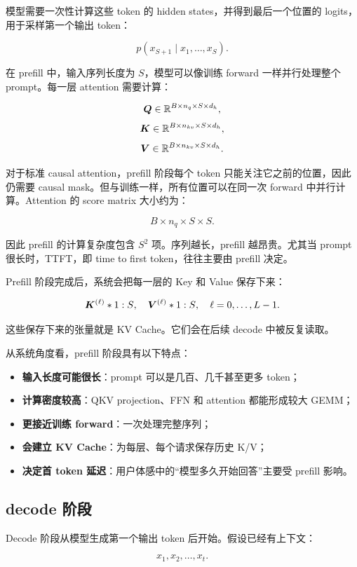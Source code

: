 模型需要一次性计算这些 token 的 hidden states，并得到最后一个位置的 logits，用于采样第一个输出 token：

\[
p(x_{S+1}\mid x_1,\ldots,x_S).
\]

在 prefill 中，输入序列长度为 $S$，模型可以像训练 forward 一样并行处理整个 prompt。每一层 attention 需要计算：

\[
\bm{Q}\in\mathbb{R}^{B\times n_q\times S\times d_h},
\]
\[
\bm{K}\in\mathbb{R}^{B\times n_{kv}\times S\times d_h},
\]
\[
\bm{V}\in\mathbb{R}^{B\times n_{kv}\times S\times d_h}.
\]

对于标准 causal attention，prefill 阶段每个 token 只能关注它之前的位置，因此仍需要 causal mask。但与训练一样，所有位置可以在同一次 forward 中并行计算。Attention 的 score matrix 大小约为：

\[
B\times n_q\times S\times S.
\]

因此 prefill 的计算复杂度包含 $S^2$ 项。序列越长，prefill 越昂贵。尤其当 prompt 很长时，TTFT，即 time to first token，往往主要由 prefill 决定。

Prefill 阶段完成后，系统会把每一层的 Key 和 Value 保存下来：

\[
\bm{K}^{(\ell)}*{1:S},
\quad
\bm{V}^{(\ell)}*{1:S},
\quad
\ell=0,\ldots,L-1.
\]

这些保存下来的张量就是 KV Cache。它们会在后续 decode 中被反复读取。

从系统角度看，prefill 阶段具有以下特点：

\begin{itemize}
\item \textbf{输入长度可能很长}：prompt 可以是几百、几千甚至更多 token；
\item \textbf{计算密度较高}：QKV projection、FFN 和 attention 都能形成较大 GEMM；
\item \textbf{更接近训练 forward}：一次处理完整序列；
\item \textbf{会建立 KV Cache}：为每层、每个请求保存历史 K/V；
\item \textbf{决定首 token 延迟}：用户体感中的“模型多久开始回答”主要受 prefill 影响。
\end{itemize}

\subsection{decode 阶段}
\label{subsec:decode-stage}

Decode 阶段从模型生成第一个输出 token 后开始。假设已经有上下文：

\[
x_1,x_2,\ldots,x_t.
\]

